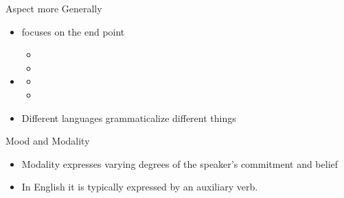\begin{frame}{Aspect more Generally}

\begin{itemize}
\item  {} focuses on the end point
  \begin{itemize}
  \item  {} 
  \item  {}  %
  \end{itemize}
\item  {} 
  \begin{itemize}
  \item  {} 
  \item  {} 
\end{itemize}
\item Different languages grammaticalize different things
\end{itemize}


\end{frame}

\begin{frame}{Mood and Modality}
\begin{itemize}
\item  Modality expresses varying degrees of the speaker's 
commitment and belief
\item In English it is typically expressed by an auxiliary verb.
\begin{exe}
  \ex {}
  \ex {}
  \ex {}
  \ex {}
  \ex {}
  \ex {}
  \ex {}
  \ex {}
\end{exe}
\end{itemize}

\end{frame}

